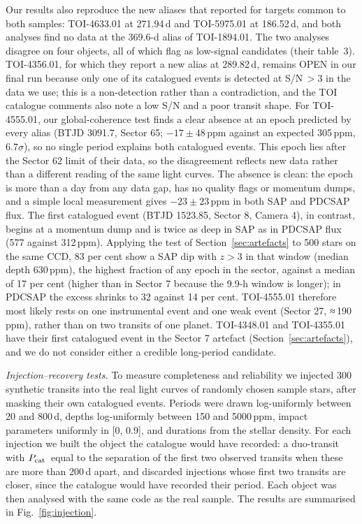 \documentclass[fleqn,usenatbib]{mnras}
\newcommand{\Pcat}{\ensuremath{P_{\rm cat}}}
\begin{document}
Our results also reproduce the new aliases that \citet{Bass2025} reported for targets common to both samples: TOI-4633.01 at 271.94\,d and TOI-5975.01 at 186.52\,d, and both analyses find no data at the 369.6-d alias of TOI-1894.01. The two analyses disagree on four objects, all of which \citet{Bass2025} flag as low-signal candidates (their table~3). TOI-4356.01, for which they report a new alias at 289.82\,d, remains OPEN in our final run because only one of its catalogued events is detected at S/N\,$> 3$ in the data we use; this is a non-detection rather than a contradiction, and the TOI catalogue comments also note a low S/N and a poor transit shape. For TOI-4555.01, our global-coherence test finds a clear absence at an epoch predicted by every alias (BTJD 3091.7, Sector 65; $-17 \pm 48$\,ppm against an expected 305\,ppm, $6.7\sigma$), so no single period explains both catalogued events. This epoch lies after the Sector 62 limit of their data, so the disagreement reflects new data rather than a different reading of the same light curves. The absence is clean: the epoch is more than a day from any data gap, has no quality flags or momentum dumps, and a simple local measurement gives $-23 \pm 23$\,ppm in both SAP and PDCSAP flux. The first catalogued event (BTJD 1523.85, Sector 8, Camera 4), in contrast, begins at a momentum dump and is twice as deep in SAP as in PDCSAP flux (577 against 312\,ppm). Applying the test of Section~\ref{sec:artefacts} to 500 stars on the same CCD, 83 per cent show a SAP dip with $z > 3$ in that window (median depth 630\,ppm), the highest fraction of any epoch in the sector, against a median of 17 per cent (higher than in Sector 7 because the 9.9-h window is longer); in PDCSAP the excess shrinks to 32 against 14 per cent. TOI-4555.01 therefore most likely rests on one instrumental event and one weak event (Sector 27, ≈\,190\,ppm), rather than on two transits of one planet. TOI-4348.01 and TOI-4355.01 have their first catalogued event in the Sector 7 artefact (Section~\ref{sec:artefacts}), and we do not consider either a credible long-period candidate.

\textit{Injection--recovery tests.} To measure completeness and reliability we injected 300 synthetic transits into the real light curves of randomly chosen sample stars, after masking their own catalogued events. Periods were drawn log-uniformly between 20 and 800\,d, depths log-uniformly between 150 and 5000\,ppm, impact parameters uniformly in [0, 0.9], and durations from the stellar density. For each injection we built the object the catalogue would have recorded: a duo-transit with \Pcat\ equal to the separation of the first two observed transits when these are more than 200\,d apart, and discarded injections whose first two transits are closer, since the catalogue would have recorded their period. Each object was then analysed with the same code as the real sample. The results are summarised in Fig.~\ref{fig:injection}.
\end{document}
